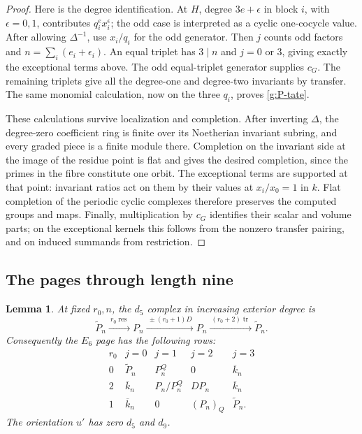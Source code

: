 \documentclass[11pt]{article}
\newtheorem{lemma}[theorem]{Lemma}
\theoremstyle{definition}
\theoremstyle{remark}
\numberwithin{equation}{section}
\begin{document}
\begin{proof}
Here is the degree identification.  At $H$, degree
$3e+\epsilon$ in block $i$, with $\epsilon=0,1$, contributes
$q_i^ex_i^\epsilon$; the odd case is interpreted as a cyclic
one-cocycle value.  After allowing $\Delta^{-1}$, use
$x_i/q_i$ for the odd generator.  Then $j$ counts odd factors
and $n=\sum_i(e_i+\epsilon_i)$.  An equal triplet has $3\mid n$
and $j=0$ or $3$, giving exactly the exceptional terms above.
The odd equal-triplet generator supplies $c_G$.
The remaining triplets give all the degree-one and degree-two
invariants by transfer.  The same monomial calculation, now on
the three $q_i$, proves \eqref{g:P-tate}.

These calculations survive localization and completion.  After
inverting $\Delta$, the degree-zero coefficient ring is finite
over its Noetherian invariant subring, and every graded piece is
a finite module there.  Completion on the invariant side at the
image of the residue point is flat and gives the desired
completion, since the primes in the fibre constitute one orbit.
The exceptional terms are supported at that point: invariant
ratios act on them by their values at $x_i/x_0=1$ in $k$.
Flat completion of the periodic cyclic complexes therefore
preserves the computed groups and maps.  Finally, multiplication
by $c_G$ identifies their scalar and volume parts; on the
exceptional kernels this follows from the nonzero transfer
pairing, and on induced summands from restriction.
\end{proof}

\subsection{The pages through length nine}

\begin{lemma}\label{g:early-pages}
At fixed $r_0,n$, the $d_5$ complex in increasing exterior degree is
\begin{equation}\label{g:d5-complex}
 \widetilde P_n\xrightarrow{\ r_0\operatorname{res}\ }P_n
 \xrightarrow{\ \pm(r_0+1)D\ }P_n
 \xrightarrow{\ (r_0+2)\operatorname{tr}\ }\widetilde P_n.
\end{equation}
Consequently the $E_6$ page has the following rows:
\begin{equation}\label{g:E6}
\begin{array}{c|cccc}
 r_0&j=0&j=1&j=2&j=3\\\hline
 0&\widetilde P_n&P_n^Q&0&\overline k_n\\
 2&\overline k_n&P_n/P_n^Q&DP_n&\overline k_n\\
 1&\overline k_n&0&(P_n)_Q&\widetilde P_n.
\end{array}
\end{equation}
The orientation $u'$ has zero $d_5$ and $d_9$.
\end{lemma}
\end{document}
